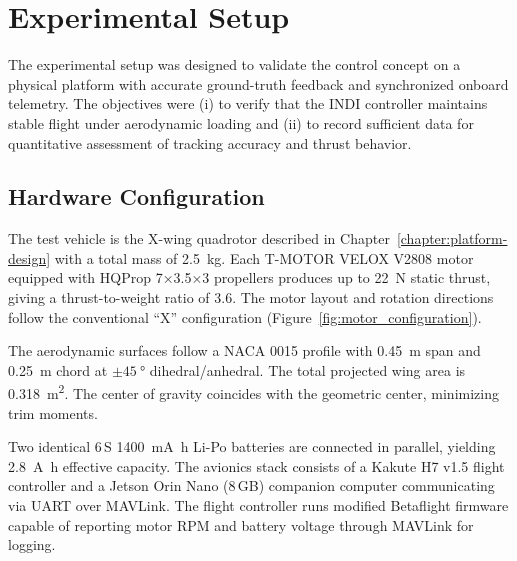 
\chapter{Experimental Setup}\label{chapter:experimental-setup}

The experimental setup was designed to validate the control concept on a physical platform with accurate ground-truth feedback and synchronized onboard telemetry.
The objectives were (i) to verify that the INDI controller maintains stable flight under aerodynamic loading and (ii) to record sufficient data for quantitative assessment of tracking accuracy and thrust behavior.

\section{Hardware Configuration}\label{sec:hardware}

The test vehicle is the X-wing quadrotor described in Chapter~\ref{chapter:platform-design} with a total mass of \SI{2.5}{\kilogram}.
Each T-MOTOR VELOX V2808 motor equipped with HQProp 7×3.5×3 propellers produces up to \SI{22}{\newton} static thrust, giving a thrust-to-weight ratio of 3.6.
The motor layout and rotation directions follow the conventional ``X'' configuration (Figure~\ref{fig:motor_configuration}).

The aerodynamic surfaces follow a NACA 0015 profile with \SI{0.45}{\meter} span and \SI{0.25}{\meter} chord at $\pm\SI{45}{\degree}$ dihedral/anhedral.
The total projected wing area is \SI{0.318}{\meter\squared}.
The center of gravity coincides with the geometric center, minimizing trim moments.

Two identical 6\,S \SI{1400}{\milli\ampere\hour} Li-Po batteries are connected in parallel, yielding \SI{2.8}{\ampere\hour} effective capacity.
The avionics stack consists of a Kakute H7 v1.5 flight controller and a Jetson Orin Nano (8\,GB) companion computer communicating via UART over MAVLink.
The flight controller runs modified Betaflight firmware capable of reporting motor RPM and battery voltage through MAVLink for logging.

